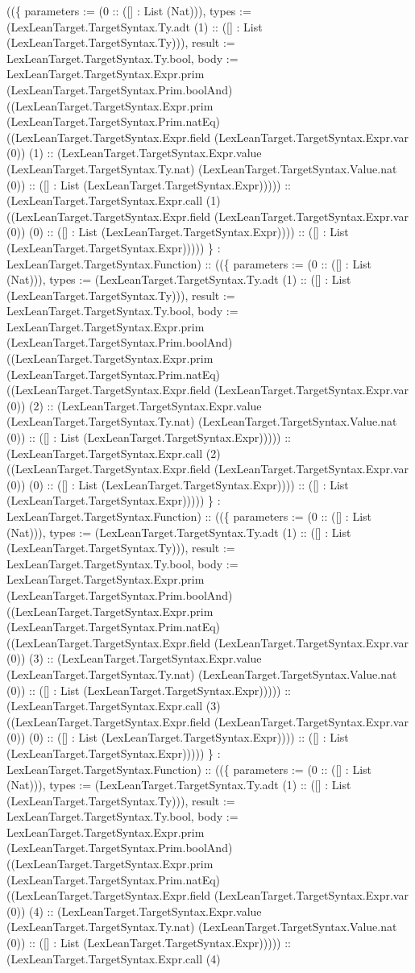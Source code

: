 \documentclass[11pt]{article}
\begin{document}
((\{ parameters := (0 :: ([] : List (Nat))), types := (LexLeanTarget.TargetSyntax.Ty.adt (1) :: ([] : List (LexLeanTarget.TargetSyntax.Ty))), result := LexLeanTarget.TargetSyntax.Ty.bool, body := LexLeanTarget.TargetSyntax.Expr.prim (LexLeanTarget.TargetSyntax.Prim.boolAnd) ((LexLeanTarget.TargetSyntax.Expr.prim (LexLeanTarget.TargetSyntax.Prim.natEq) ((LexLeanTarget.TargetSyntax.Expr.field (LexLeanTarget.TargetSyntax.Expr.var (0)) (1) :: (LexLeanTarget.TargetSyntax.Expr.value (LexLeanTarget.TargetSyntax.Ty.nat) (LexLeanTarget.TargetSyntax.Value.nat (0)) :: ([] : List (LexLeanTarget.TargetSyntax.Expr))))) :: (LexLeanTarget.TargetSyntax.Expr.call (1) ((LexLeanTarget.TargetSyntax.Expr.field (LexLeanTarget.TargetSyntax.Expr.var (0)) (0) :: ([] : List (LexLeanTarget.TargetSyntax.Expr)))) :: ([] : List (LexLeanTarget.TargetSyntax.Expr))))) \} : LexLeanTarget.TargetSyntax.Function) :: ((\{ parameters := (0 :: ([] : List (Nat))), types := (LexLeanTarget.TargetSyntax.Ty.adt (1) :: ([] : List (LexLeanTarget.TargetSyntax.Ty))), result := LexLeanTarget.TargetSyntax.Ty.bool, body := LexLeanTarget.TargetSyntax.Expr.prim (LexLeanTarget.TargetSyntax.Prim.boolAnd) ((LexLeanTarget.TargetSyntax.Expr.prim (LexLeanTarget.TargetSyntax.Prim.natEq) ((LexLeanTarget.TargetSyntax.Expr.field (LexLeanTarget.TargetSyntax.Expr.var (0)) (2) :: (LexLeanTarget.TargetSyntax.Expr.value (LexLeanTarget.TargetSyntax.Ty.nat) (LexLeanTarget.TargetSyntax.Value.nat (0)) :: ([] : List (LexLeanTarget.TargetSyntax.Expr))))) :: (LexLeanTarget.TargetSyntax.Expr.call (2) ((LexLeanTarget.TargetSyntax.Expr.field (LexLeanTarget.TargetSyntax.Expr.var (0)) (0) :: ([] : List (LexLeanTarget.TargetSyntax.Expr)))) :: ([] : List (LexLeanTarget.TargetSyntax.Expr))))) \} : LexLeanTarget.TargetSyntax.Function) :: ((\{ parameters := (0 :: ([] : List (Nat))), types := (LexLeanTarget.TargetSyntax.Ty.adt (1) :: ([] : List (LexLeanTarget.TargetSyntax.Ty))), result := LexLeanTarget.TargetSyntax.Ty.bool, body := LexLeanTarget.TargetSyntax.Expr.prim (LexLeanTarget.TargetSyntax.Prim.boolAnd) ((LexLeanTarget.TargetSyntax.Expr.prim (LexLeanTarget.TargetSyntax.Prim.natEq) ((LexLeanTarget.TargetSyntax.Expr.field (LexLeanTarget.TargetSyntax.Expr.var (0)) (3) :: (LexLeanTarget.TargetSyntax.Expr.value (LexLeanTarget.TargetSyntax.Ty.nat) (LexLeanTarget.TargetSyntax.Value.nat (0)) :: ([] : List (LexLeanTarget.TargetSyntax.Expr))))) :: (LexLeanTarget.TargetSyntax.Expr.call (3) ((LexLeanTarget.TargetSyntax.Expr.field (LexLeanTarget.TargetSyntax.Expr.var (0)) (0) :: ([] : List (LexLeanTarget.TargetSyntax.Expr)))) :: ([] : List (LexLeanTarget.TargetSyntax.Expr))))) \} : LexLeanTarget.TargetSyntax.Function) :: ((\{ parameters := (0 :: ([] : List (Nat))), types := (LexLeanTarget.TargetSyntax.Ty.adt (1) :: ([] : List (LexLeanTarget.TargetSyntax.Ty))), result := LexLeanTarget.TargetSyntax.Ty.bool, body := LexLeanTarget.TargetSyntax.Expr.prim (LexLeanTarget.TargetSyntax.Prim.boolAnd) ((LexLeanTarget.TargetSyntax.Expr.prim (LexLeanTarget.TargetSyntax.Prim.natEq) ((LexLeanTarget.TargetSyntax.Expr.field (LexLeanTarget.TargetSyntax.Expr.var (0)) (4) :: (LexLeanTarget.TargetSyntax.Expr.value (LexLeanTarget.TargetSyntax.Ty.nat) (LexLeanTarget.TargetSyntax.Value.nat (0)) :: ([] : List (LexLeanTarget.TargetSyntax.Expr))))) :: (LexLeanTarget.TargetSyntax.Expr.call (4) 
\end{document}
